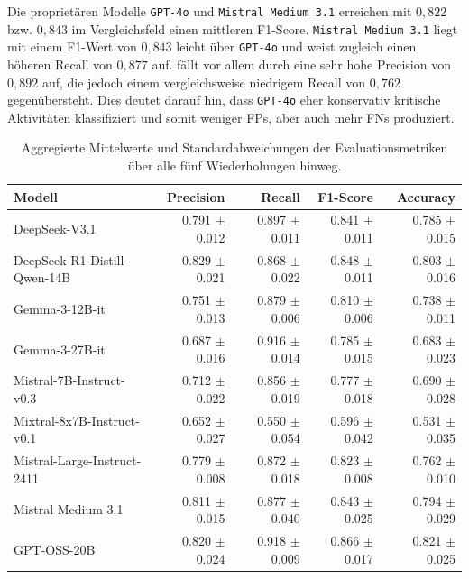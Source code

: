Die proprietären Modelle \texttt{GPT-4o} und \texttt{Mistral Medium 3.1} erreichen mit $0{,}822$ bzw. $0{,}843$ im Vergleichsfeld einen mittleren F1-Score. \texttt{Mistral Medium 3.1} liegt mit
einem F1-Wert von $0{,}843$ leicht über \texttt{GPT-4o} und weist zugleich
einen höheren Recall von $0{,}877$ auf.  fällt vor allem durch eine sehr hohe Precision von $0{,}892$ auf, die jedoch einem vergleichsweise niedrigem Recall von $0{,}762$ gegenübersteht. Dies deutet darauf hin, dass \texttt{GPT-4o} eher konservativ kritische Aktivitäten klassifiziert und somit weniger \acp{FP}, aber auch mehr \acp{FN} produziert.

\begin{table}[htbp]
    \centering
    \caption{Aggregierte Mittelwerte und Standardabweichungen der Evaluationsmetriken über alle fünf Wiederholungen hinweg.}
    \label{tab:metrics-overview}
    \begin{adjustbox}{width=\textwidth}
        \begin{tabular}{l r r r r}
            \toprule
            Modell                          & Precision         & Recall            & F1-Score          & Accuracy \\
            \midrule
            DeepSeek-V3.1                   & 0.791 $\pm$ 0.012 & 0.897 $\pm$ 0.011 & 0.841 $\pm$ 0.011 & 0.785 $\pm$ 0.015 \\
            DeepSeek-R1-Distill-Qwen-14B    & 0.829 $\pm$ 0.021 & 0.868 $\pm$ 0.022 & 0.848 $\pm$ 0.011 & 0.803 $\pm$ 0.016 \\
            Gemma-3-12B-it                  & 0.751 $\pm$ 0.013 & 0.879 $\pm$ 0.006 & 0.810 $\pm$ 0.006 & 0.738 $\pm$ 0.011 \\
            Gemma-3-27B-it                  & 0.687 $\pm$ 0.016 & 0.916 $\pm$ 0.014 & 0.785 $\pm$ 0.015 & 0.683 $\pm$ 0.023 \\
            Mistral-7B-Instruct-v0.3        & 0.712 $\pm$ 0.022 & 0.856 $\pm$ 0.019 & 0.777 $\pm$ 0.018 & 0.690 $\pm$ 0.028 \\
            Mixtral-8x7B-Instruct-v0.1      & 0.652 $\pm$ 0.027 & 0.550 $\pm$ 0.054 & 0.596 $\pm$ 0.042 & 0.531 $\pm$ 0.035 \\
            Mistral-Large-Instruct-2411     & 0.779 $\pm$ 0.008 & 0.872 $\pm$ 0.018 & 0.823 $\pm$ 0.008 & 0.762 $\pm$ 0.010 \\
            Mistral Medium 3.1              & 0.811 $\pm$ 0.015 & 0.877 $\pm$ 0.040 & 0.843 $\pm$ 0.025 & 0.794 $\pm$ 0.029 \\
            GPT-OSS-20B                     & 0.820 $\pm$ 0.024 & 0.918 $\pm$ 0.009 & 0.866 $\pm$ 0.017 & 0.821 $\pm$ 0.025 \\

\end{tabular}
\end{adjustbox}
\end{table}
